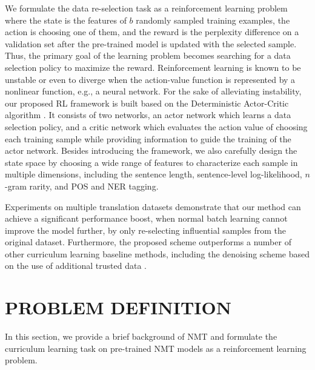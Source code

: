 \documentclass[letterpaper]{article}
\begin{document}
We formulate the data re-selection task as a reinforcement learning problem where the state is the features of $b$ randomly sampled training examples, the action is choosing one of them, and the reward is the perplexity difference on a validation set after the pre-trained model is updated with the selected sample. Thus, the primary goal of the learning problem becomes searching for a data selection policy to maximize the reward. Reinforcement learning is known to be unstable or even to diverge when the action-value function is represented by a nonlinear function, e.g., a neural network. For the sake of alleviating instability, our proposed RL framework is built based on the Deterministic Actor-Critic algorithm \cite{silver2014deterministic}. It consists of two networks, an actor network which learns a data selection policy, and a critic network which evaluates the action value of choosing each training sample while providing information to guide the training of the actor network. Besides introducing the framework, we also carefully design the state space by choosing a wide range of features to characterize each sample in multiple dimensions, including the sentence length, sentence-level log-likelihood, $n$-gram rarity, and POS and NER tagging.

Experiments on multiple translation datasets demonstrate that our method can achieve a significant performance boost, when normal batch learning cannot improve the model further, by only re-selecting influential samples from the original dataset. Furthermore, the proposed scheme outperforms a number of other curriculum learning baseline methods, including the denoising scheme based on the use of additional trusted data \cite{wang2018denoising}.

\section{PROBLEM DEFINITION}
\label{sec:prob}

In this section, we provide a brief background of NMT and formulate the curriculum learning task on pre-trained NMT models as a reinforcement learning problem.
\end{document}

